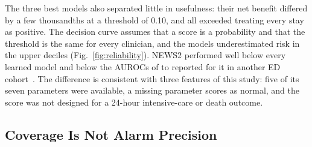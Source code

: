 The three best models also separated little in usefulness: their net benefit differed by a few thousandths at a threshold of 0.10, and all exceeded treating every stay
as positive. The decision curve assumes that a score is a probability and that the threshold is the same for every clinician, and the models underestimated risk in the
upper deciles (Fig.~\ref{fig:reliability}). NEWS2 performed well below every learned model and below the AUROCs of \RVRefNewsLo{} to \RVRefNewsHi{} reported for it in
another ED cohort~\cite{mhdyunin2025news2}. The difference is consistent with three features of this study: five of its seven parameters were available, a missing
parameter scores as normal, and the score was not designed for a 24-hour intensive-care or death outcome.

\subsection{Coverage Is Not Alarm Precision}

